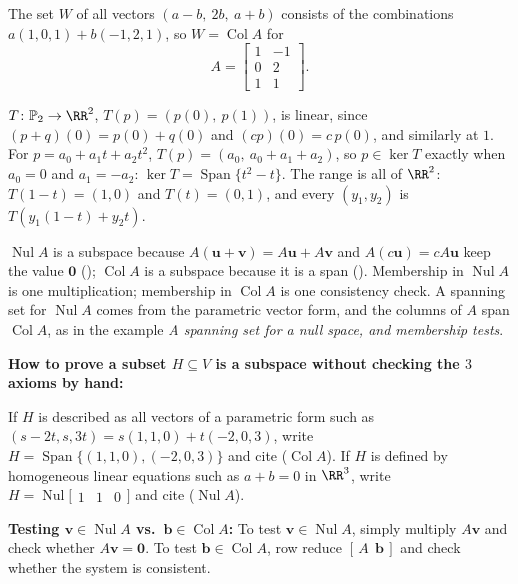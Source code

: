\documentclass[10pt]{scrartcl}
\newcommand{\vv}[1]{\mathbf{#1}}
\DeclareMathOperator{\spn}{Span}\DeclareMathOperator{\Nul}{Nul}\DeclareMathOperator{\Col}{Col}\DeclareMathOperator{\Row}{Row}\DeclareMathOperator{\adj}{adj}
\begin{document}
\begin{example*}
The set $W$ of all vectors $(a-b,\ 2b,\ a+b)$ consists of the combinations $a(1,0,1)+b(-1,2,1)$, so $W=\Col A$ for
\[
  A=\begin{bmatrix}1&-1\\0&2\\1&1\end{bmatrix}.
\]
\end{example*}

\begin{example*}
$T\colon\mathbb P_2\to\RR^2$, $T(p)=(p(0),\ p(1))$, is linear, since $(p+q)(0)=p(0)+q(0)$ and $(cp)(0)=c\,p(0)$, and similarly at $1$. For $p=a_0+a_1t+a_2t^2$, $T(p)=(a_0,\ a_0+a_1+a_2)$, so $p\in\ker T$ exactly when $a_0=0$ and $a_1=-a_2$: $\ker T=\spn\{t^2-t\}$. The range is all of $\RR^2$: $T(1-t)=(1,0)$ and $T(t)=(0,1)$, and every $(y_1,y_2)$ is $T(y_1(1-t)+y_2t)$.
\end{example*}

\revisit
$\Nul A$ is a subspace because $A(\vv u+\vv v)=A\vv u+A\vv v$ and $A(c\vv u)=cA\vv u$ keep the value $\vv 0$ (); $\Col A$ is a subspace because it is a span (). Membership in $\Nul A$ is one multiplication; membership in $\Col A$ is one consistency check. A spanning set for $\Nul A$ comes from the parametric vector form, and the columns of $A$ span $\Col A$, as in the example \emph{A spanning set for a null space, and membership tests}.

\begin{shortcuts}
  \ii \textbf{How to prove a subset $H\subseteq V$ is a subspace without checking the $3$ axioms by hand:}
  \begin{enumerate}[(1)]
    \ii If $H$ is described as all vectors of a parametric form such as $(s-2t,s,3t)=s(1,1,0)+t(-2,0,3)$, write $H=\spn\{(1,1,0),(-2,0,3)\}$ and cite  ($\Col A$).
    \ii If $H$ is defined by homogeneous linear equations such as $a+b=0$ in $\RR^3$, write $H=\Nul\bigl[\begin{smallmatrix}1&1&0\end{smallmatrix}\bigr]$ and cite  ($\Nul A$).
  \end{enumerate}
  \ii \textbf{Testing $\vv v\in\Nul A$ vs.\ $\vv b\in\Col A$:} To test $\vv v\in\Nul A$, simply multiply $A\vv v$ and check whether $A\vv v=\vv 0$. To test $\vv b\in\Col A$, row reduce $[\,A\ \ \vv b\,]$ and check whether the system is consistent.
\end{shortcuts}
\end{document}
